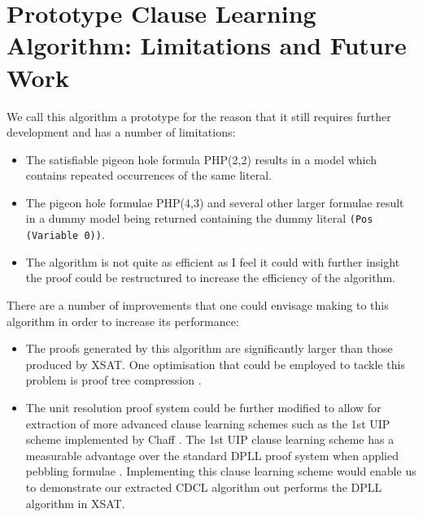 \section{Prototype Clause Learning Algorithm: Limitations and Future Work}
We call this algorithm a prototype for the reason that it still requires further development and has a number of limitations:

\begin{itemize}
\item The satisfiable pigeon hole formula PHP(2,2) results in a model which contains repeated occurrences of the same literal.

\item The pigeon hole formulae PHP(4,3) and several other larger formulae result in a dummy model being returned containing the dummy literal \texttt{(Pos (Variable 0))}.

\item The algorithm is not quite as efficient as I feel it could with further insight the proof could be restructured to increase the efficiency of the algorithm.

\end{itemize}

There are a number of improvements that one could envisage making to this algorithm in order to increase its performance:

\begin{itemize}

\item The proofs generated by this algorithm are significantly larger than those produced by XSAT. One optimisation that could be employed to tackle this problem is proof tree compression \cite{AH07,SR14}.

\item The unit resolution proof system could be further modified to allow for extraction of more advanced clause learning schemes such as the 1st UIP scheme implemented by Chaff \cite{MM01}. The 1st UIP clause learning scheme has a measurable advantage over the standard DPLL proof system when applied pebbling formulae \cite{PB04}. Implementing this clause learning scheme would enable us to demonstrate our extracted CDCL algorithm out performs the DPLL algorithm in XSAT.


\end{itemize}






